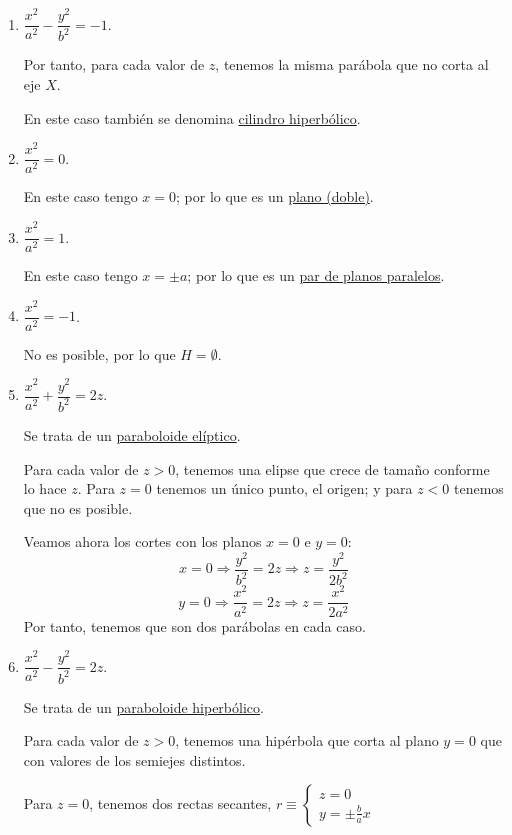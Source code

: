 \begin{enumerate}
    \item $\dfrac{x^2}{a^2} - \dfrac{y^2}{b^2} = -1$.

    Por tanto, para cada valor de $z$, tenemos la misma parábola que no corta al eje $X$.

    En este caso también se denomina \ul{cilindro hiperbólico}.
    
    \item $\dfrac{x^2}{a^2} = 0$.

    En este caso tengo $x=0$; por lo que es un \ul{plano (doble)}.
    
    \item $\dfrac{x^2}{a^2} = 1$.

    En este caso tengo $x=\pm a$; por lo que es un \ul{par de planos paralelos}.
    
    \item $\dfrac{x^2}{a^2} = -1$.

    No es posible, por lo que $H=\emptyset$.
    
    \item $\dfrac{x^2}{a^2} + \dfrac{y^2}{b^2} = 2z$.

    Se trata de un \ul{paraboloide elíptico}. 
    
    Para cada valor de $z>0$, tenemos una elipse que crece de tamaño conforme lo hace $z$. Para $z=0$ tenemos un único punto, el origen; y para $z<0$ tenemos que no es posible.

    Veamos ahora los cortes con los planos $x=0$ e $y=0$:
    \begin{equation*}
        x = 0 \Longrightarrow \dfrac{y^2}{b^2} = 2z \Longrightarrow z=\dfrac{y^2}{2b^2}
    \end{equation*}
    \begin{equation*}
        y = 0 \Longrightarrow \dfrac{x^2}{a^2} = 2z \Longrightarrow z=\dfrac{x^2}{2a^2}
    \end{equation*}
    Por tanto, tenemos que son dos parábolas en cada caso.
    
    
    \item $\dfrac{x^2}{a^2} - \dfrac{y^2}{b^2} = 2z$.

    Se trata de un \ul{paraboloide hiperbólico}. 
    
    Para cada valor de $z>0$, tenemos una hipérbola que corta al plano $y=0$ que con valores de los semiejes distintos. 
    
    Para $z=0$, tenemos dos rectas secantes, $r\equiv \left\{\begin{array}{l}
        z=0  \\
        y = \pm \frac{b}{a}x 
    \end{array}\right.$ 
    

\end{enumerate}

